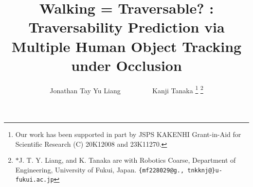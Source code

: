 \documentclass[letterpaper, 10 pt, conference]{ieeeconf}
\begin{document}
\newcommand{\figG}{
\begin{figure}[t!]
\FIG{4}{7a.eps}{(a)}
\FIG{4}{7b.eps}{(b)}
\caption{(a) Robot set up, with a monocular camera mounted on the platform of approx. 1m height from ground (b) Robot path taken for data collection as shown in ORB-SLAM3.}\label{fig:7}
\vspace*{-5mm}
\end{figure}
}



\newcommand{\tabA}{
\begin{table}[t]
\caption{Performance results.}
  \centering
    \begin{tabular}{l|rrr}
    \hline
& I-Cfg. & L-Cfg. & T-Cfg. \\\hline
SfM + PfH + HO3 & 2.35  & 18.68 & 15.77 \\
SfM + PfH  & 0.89  & 15.69  & 14.67 \\
SfM + HO3  & 4.53  & 16.66  & 10.53 \\
PfH + HO3  & 7.54  & 23.36  & 17.56 \\
SfM   & 3.62  &  19.04   & 29.89 \\
PfH   & 12.03 &  16.48  & 18.77 \\
HO3   & 13.38 & 10.3  & 16.45 \\\hline
\end{tabular}
  \label{tab:1}
\end{table}
}










\title{\Large \bf%
Walking = Traversable? : \\ Traversability Prediction via Multiple Human Object Tracking under Occlusion
}




\author{Jonathan Tay Yu Liang ~~~~~~~~ Kanji Tanaka
\thanks{Our work has been supported in part by JSPS KAKENHI Grant-in-Aid for Scientific Research (C) 20K12008 and 23K11270.}
\thanks{$*$J. T. Y. Liang, and K. Tanaka are with Robotics Coarse, Department of Engineering, University of Fukui, Japan. 
{\tt\small{\{mf228029@g., tnkknj@\}u-fukui.ac.jp}}
}}
\end{document}
